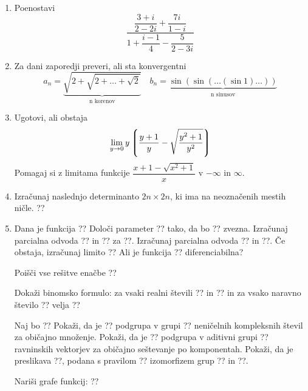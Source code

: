 \documentclass[a4paper,12pt]{article}
\begin{document}
\begin{enumerate}
\item Poenostavi
\[ \dfrac{\dfrac{3 + i}{2 - 2i} + \dfrac{7i}{1 - i}}{1 + \dfrac{i - 1}{4} - \dfrac{5}{2 - 3i}}          \]

\item Za dani zaporedji preveri, ali sta konvergentni
\[a_n = \underbrace{ \sqrt{2 + \sqrt{2 + \dots + \sqrt{2}}}}_{\text{n korenov}} \quad b_n = \underbrace{\sin(\sin(\dots(\sin 1)\dots))}_{\text{n sinusov}}       \]

\item Ugotovi, ali obstaja
$$\lim_{y \to 0}y \left \lgroup \dfrac{y + 1 }{y} - \sqrt{\dfrac{y^2 + 1}{y^2}} \right \rgroup $$
Pomagaj si z limitama funkcije $\dfrac{x + 1 - \sqrt{x^2 + 1}}{x}$ v $-\infty$ in $\infty$.

\item Izračunaj naslednjo determinanto $2n \times 2n$, ki ima na neoznačenih mestih ničle.
??

\item Dana je funkcija
??
Določi parameter ?? tako, da bo ?? zvezna.
Izračunaj parcialna odvoda ?? in ?? za ??.
Izračunaj parcialna odvoda ?? in ??.
Če obstaja, izračunaj limito
??
Ali je funkcija ?? diferenciabilna?

Poišči vse rešitve enačbe
??

Dokaži binomsko formulo: za vsaki realni števili ?? in ?? in za vsako naravno število ?? velja
??

Naj bo
??
Pokaži, da je ?? podgrupa v grupi ??
neničelnih kompleksnih števil za običajno množenje.
Pokaži, da je ?? podgrupa v aditivni grupi ??
ravninskih vektorjev za običajno seštevanje po komponentah.
Pokaži, da je preslikava ??, podana s pravilom
??
izomorfizem grup ?? in ??.

Nariši grafe funkcij:
??

\end{enumerate}
\end{document}
